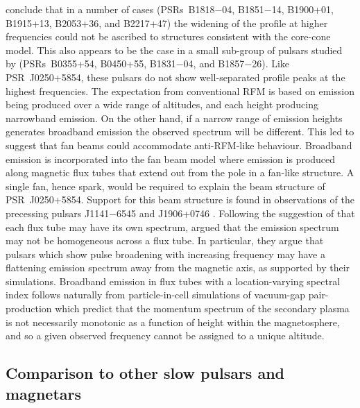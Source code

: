 \citet{CWxx2014} conclude that in a number of cases (PSRs~B1818$-$04, B1851$-$14, B1900+01, B1915+13, B2053+36, and B2217+47) the widening of the profile at higher frequencies could not be ascribed to structures consistent with the core-cone model. This also appears to be the case in a small sub-group of pulsars studied by \citet{PHS+2016} (PSRs~B0355+54, B0450+55, B1831$-$04, and B1857$-$26). Like PSR~J0250+5854, these pulsars do not show well-separated profile peaks at the highest frequencies. The expectation from conventional RFM is based on emission being produced over a wide range of altitudes, and each height producing narrowband emission. On the other hand, if a narrow range of emission heights generates broadband emission the observed spectrum will be different. This led \citet{CWxx2014} to suggest that fan beams could accommodate anti-RFM-like behaviour. Broadband emission is incorporated into the fan beam model \citep{Mxxx1987, DRDx2010, DRxx2012, DRxx2013, WPZ+2014} where emission is produced along magnetic flux tubes that extend out from the pole in a fan-like structure. A single fan, hence spark, would be required to explain the beam structure of PSR~J0250+5854. Support for this beam structure is found in observations of the precessing pulsars J1141$-$6545 and J1906+0746 \citep{MKS+2010, DKC+2013}. Following the suggestion of \citet{Mxxx1987} that each flux tube may have its own spectrum, \citet{CWC+2007} argued that the emission spectrum may not be homogeneous across a flux tube. In particular, they argue that pulsars which show pulse broadening with increasing frequency may have a flattening emission spectrum away from the magnetic axis, as supported by their simulations. Broadband emission in flux tubes with a location-varying spectral index follows naturally from particle-in-cell simulations of vacuum-gap pair-production \citep{Txxx2010} which predict that the momentum spectrum of the secondary plasma is not necessarily monotonic as a function of height within the magnetosphere, and so a given observed frequency cannot be assigned to a unique altitude.


















\subsection{Comparison to other slow pulsars and magnetars}
\label{sec: J0250 - discussion - magnetar comparison}

